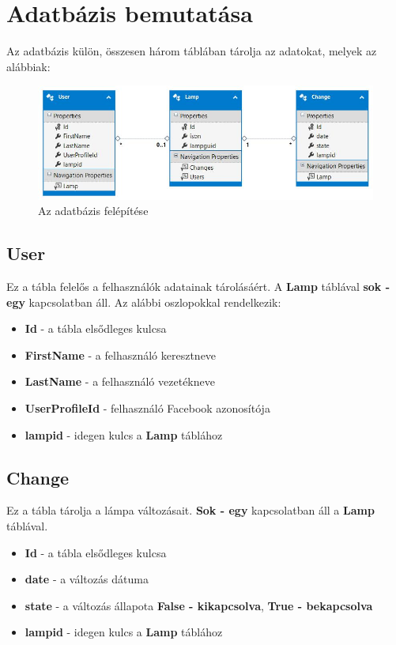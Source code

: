 \documentclass[a4paper,12pt]{report}
\begin{document}
    \section{Adatbázis bemutatása}
    Az adatbázis külön, összesen három táblában tárolja az adatokat, melyek az alábbiak:

    \begin{figure}[H]
        \centering
        \includegraphics[width=\linewidth]{images/database.jpg}
        \caption{Az adatbázis felépítése}
        \label{fig: Database}
    \end{figure}

    \subsection{User}
    Ez a tábla felelős a felhasználók adatainak tárolásáért. A \textbf{Lamp} táblával \textbf{sok - egy} kapcsolatban áll. Az alábbi
    oszlopokkal rendelkezik:

    \begin{itemize}
        \item \textbf{Id} - a tábla elsődleges kulcsa
        \item \textbf{FirstName} - a felhasználó keresztneve
        \item \textbf{LastName} - a felhasználó vezetékneve
        \item \textbf{UserProfileId} - felhasználó Facebook azonosítója
        \item \textbf{lampid} - idegen kulcs a \textbf{Lamp} táblához
    \end{itemize}

    \subsection{Change}
    Ez a tábla tárolja a lámpa változásait. \textbf{Sok - egy} kapcsolatban áll a \textbf{Lamp} táblával.

    \begin{itemize}
        \item \textbf{Id} - a tábla elsődleges kulcsa
        \item \textbf{date} - a változás dátuma
        \item \textbf{state} - a változás állapota \textbf{False - kikapcsolva}, \textbf{True - bekapcsolva}
        \item \textbf{lampid} - idegen kulcs a \textbf{Lamp} táblához
    \end{itemize}
\end{document}
